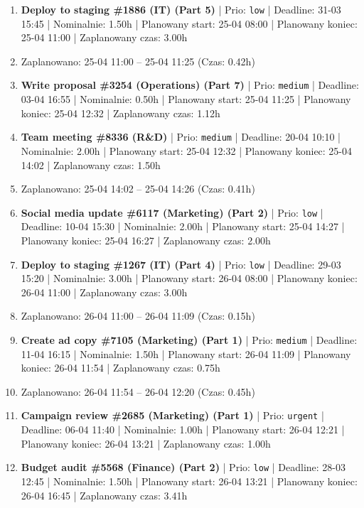 {\begin{enumerate}
  \item [\textbf{14697}] \textbf{Deploy to staging \#1886 (IT) (Part 5)} | Prio: \texttt{low} | Deadline: 31-03 15:45 | Nominalnie: 1.50h | Planowany start: 25-04 08:00 | Planowany koniec: 25-04 11:00 | Zaplanowany czas: 3.00h
  \item [\textbf{PRZERWA}] Zaplanowano: 25-04 11:00 -- 25-04 11:25 (Czas: 0.42h)
  \item [\textbf{14663}] \textbf{Write proposal \#3254 (Operations) (Part 7)} | Prio: \texttt{medium} | Deadline: 03-04 16:55 | Nominalnie: 0.50h | Planowany start: 25-04 11:25 | Planowany koniec: 25-04 12:32 | Zaplanowany czas: 1.12h
  \item [\textbf{14649}] \textbf{Team meeting \#8336 (R\&D)} | Prio: \texttt{medium} | Deadline: 20-04 10:10 | Nominalnie: 2.00h | Planowany start: 25-04 12:32 | Planowany koniec: 25-04 14:02 | Zaplanowany czas: 1.50h
  \item [\textbf{PRZERWA}] Zaplanowano: 25-04 14:02 -- 25-04 14:26 (Czas: 0.41h)
  \item [\textbf{14700}] \textbf{Social media update \#6117 (Marketing) (Part 2)} | Prio: \texttt{low} | Deadline: 10-04 15:30 | Nominalnie: 2.00h | Planowany start: 25-04 14:27 | Planowany koniec: 25-04 16:27 | Zaplanowany czas: 2.00h
  \item [\textbf{14686}] \textbf{Deploy to staging \#1267 (IT) (Part 4)} | Prio: \texttt{low} | Deadline: 29-03 15:20 | Nominalnie: 3.00h | Planowany start: 26-04 08:00 | Planowany koniec: 26-04 11:00 | Zaplanowany czas: 3.00h
  \item [\textbf{PRZERWA}] Zaplanowano: 26-04 11:00 -- 26-04 11:09 (Czas: 0.15h)
  \item [\textbf{14650}] \textbf{Create ad copy \#7105 (Marketing) (Part 1)} | Prio: \texttt{medium} | Deadline: 11-04 16:15 | Nominalnie: 1.50h | Planowany start: 26-04 11:09 | Planowany koniec: 26-04 11:54 | Zaplanowany czas: 0.75h
  \item [\textbf{PRZERWA}] Zaplanowano: 26-04 11:54 -- 26-04 12:20 (Czas: 0.45h)
  \item [\textbf{14607}] \textbf{Campaign review \#2685 (Marketing) (Part 1)} | Prio: \texttt{urgent} | Deadline: 06-04 11:40 | Nominalnie: 1.00h | Planowany start: 26-04 12:21 | Planowany koniec: 26-04 13:21 | Zaplanowany czas: 1.00h
  \item [\textbf{14693}] \textbf{Budget audit \#5568 (Finance) (Part 2)} | Prio: \texttt{low} | Deadline: 28-03 12:45 | Nominalnie: 1.50h | Planowany start: 26-04 13:21 | Planowany koniec: 26-04 16:45 | Zaplanowany czas: 3.41h

\end{enumerate}}
